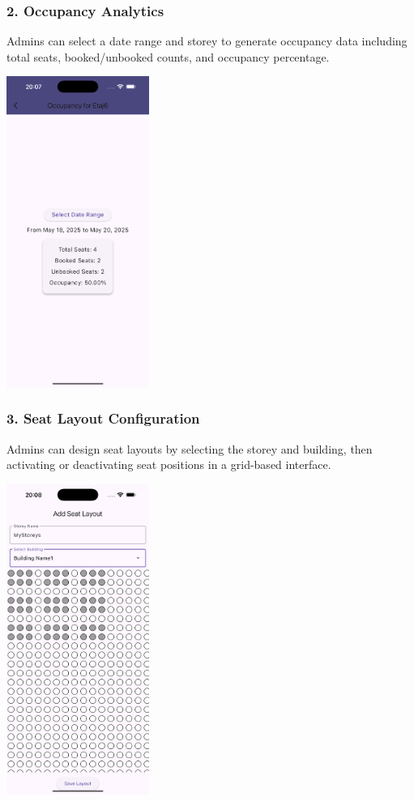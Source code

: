 \documentclass[12pt,a4paper]{report} %
\begin{document}
\subsubsection*{2. Occupancy Analytics}

Admins can select a date range and storey to generate occupancy data including total seats, booked/unbooked counts, and occupancy percentage.

\begin{center}
\includegraphics[width=0.35\textwidth]{images/Simulator Screenshot - iPhone 16 Pro Max - 2025-05-19 at 20.07.03.png}
\end{center}

\subsubsection*{3. Seat Layout Configuration}

Admins can design seat layouts by selecting the storey and building, then activating or deactivating seat positions in a grid-based interface.

\begin{center}
\includegraphics[width=0.35\textwidth]{images/Simulator Screenshot - iPhone 16 Pro Max - 2025-05-19 at 20.08.52.png}
\end{center}
\end{document}
